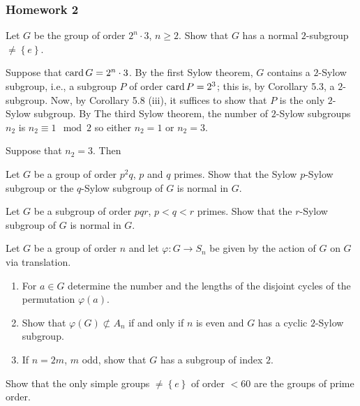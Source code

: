 \subsubsection{Homework 2}
\setcounter{exercise}{0}
\setcounter{equation}{0}

\begin{problem}
  Let $G$ be the group of order $2^n\cdot 3$, $n\geq 2$. Show that $G$ has
  a normal $2$-subgroup $\neq\left\{e\right\}$.
\end{problem}
\begin{solution}
  Suppose that $\operatorname{card} G=2^n\cdot 3$. By the first Sylow theorem, $G$
  contains a $2$-Sylow subgroup, i.e., a subgroup $P$ of order
  $\operatorname{card} P=2^3$; this is, by Corollary 5.3, a $2$-subgroup. Now, by
  Corollary 5.8 (iii), it suffices to show that $P$ is the only $2$-Sylow
  subgroup. By The third Sylow theorem, the number of $2$-Sylow subgroups
  $n_2$ is $n_2\equiv 1\mod 2$ so either $n_2=1$ or $n_2=3$.

  Suppose that $n_2=3$. Then
\end{solution}

\begin{problem}
  Let $G$ be a group of order $p^2q$, $p$ and $q$ primes. Show that the
  Sylow $p$-Sylow subgroup or the $q$-Sylow subgroup of $G$ is normal in
  $G$.
\end{problem}
\begin{solution}
\end{solution}

\begin{problem}
  Let $G$ be a subgroup of order $pqr$, $p<q<r$ primes. Show that the
  $r$-Sylow subgroup of $G$ is normal in $G$.
\end{problem}
\begin{solution}
\end{solution}

\begin{problem}
  Let $G$ be a group of order $n$ and let $\varphi\colon G\to S_n$ be given
  by the action of $G$ on $G$ via translation.
  \begin{enumerate}[label=(\alph*),noitemsep]
  \item For $a\in G$ determine the number and the lengths of the disjoint
    cycles of the permutation $\varphi(a)$.
  \item Show that $\varphi(G)\nsubset A_n$ if and only if $n$ is even and
    $G$ has a cyclic $2$-Sylow subgroup.
  \item If $n=2m$, $m$ odd, show that $G$ has a subgroup of index $2$.
  \end{enumerate}
\end{problem}
\begin{solution}
\end{solution}

\begin{problem}
  Show that the only simple groups $\neq\left\{e\right\}$ of order $<60$
  are the groups of prime order.
\end{problem}
\begin{solution}
\end{solution}

